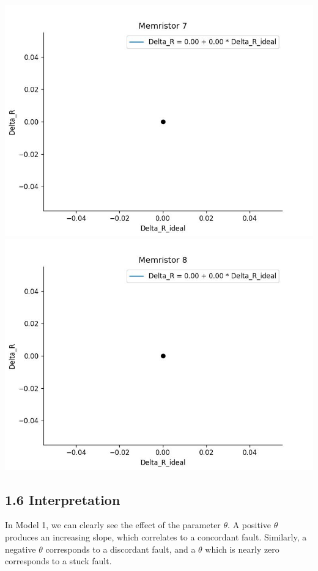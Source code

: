     \includegraphics[width=\textwidth / 2]{code/plots/model_2_memristor_7}
    \includegraphics[width=\textwidth / 2]{code/plots/model_2_memristor_8}
    \pagebreak

    \subsection*{1.6 Interpretation}
    In Model 1, we can clearly see the effect of the parameter $\theta$.
    A positive $\theta$ produces an increasing slope, which correlates to a concordant fault.
    Similarly, a negative $\theta$ corresponds to a discordant fault,
    and a $\theta$ which is nearly zero corresponds to a stuck fault.

